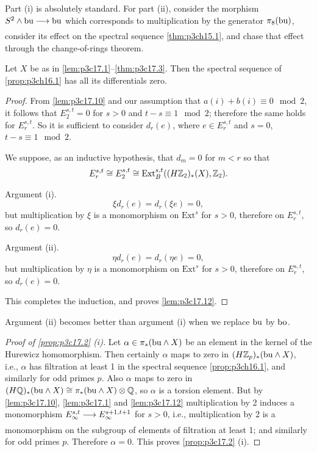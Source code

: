 \documentclass[../main]{subfiles}
\begin{document}
Part (i) is absolutely standard. For part (ii), consider the morphism $S^2 \wedge \te{bu} \lar{} \te{bu}$ which corresponds to multiplication by the generator $\pi_8(\mathrm{bu})$, consider its effect on the spectral sequence \ref{thm:p3ch15.1}, and chase that effect through the change-of-rings theorem.

\begin{lemma}
\label{lem:p3c17.12} 
Let $X$ be as in \ref{lem:p3c17.1}--\ref{thm:p3c17.3}. Then the spectral sequence of \ref{prop:p3ch16.1} has all its differentials zero. 
\end{lemma}

\begin{proof}
From \ref{lem:p3c17.10} and our assumption that $a(i) + b(i) \equiv 0 \mod 2$, it follows that $E_2^{s, t} = 0$ for $s > 0$ and $t - s \equiv 1 \mod 2$; therefore the same holds for $E_r^{s, t}$. So it is sufficient to consider $d_r(e)$, where $e \in E_r^{s, t}$ and $s = 0$, $t - s \equiv 1 \mod 2$. 

We suppose, as an inductive hypothesis, that $d_m = 0$ for $m < r$ so that \[E_r^{s, t} \cong E_2^{s, t} \cong \mathrm{Ext}_B^{s, t} ((H \mathbb{Z}_2)_\ast(X), \mathbb{Z}_2).\]

Argument (i). \[\xi d_r(e) = d_r(\xi e) = 0,\] but multiplication by $\xi$ is a monomorphism on $\mathrm{Ext}^s$ for $s > 0$, therefore on $E_r^{s, t}$, so $d_r(e) = 0$.

Argument (ii). \[\eta d_r(e) = d_r(\eta e) = 0,\] but multiplication by $\eta$ is a monomorphism on $\mathrm{Ext}^s$ for $s > 0$, therefore on $E_r^{s, t}$, so $d_r(e) = 0$.

This completes the induction, and proves \ref{lem:p3c17.12}. 
\end{proof}

\begin{remark*}
Argument (ii) becomes better than argument (i) when we replace $\mathrm{bu}$ by $\mathrm{bo}$. 
\end{remark*} 

\begin{proof}[Proof of \ref{prop:p3c17.2} (i)]
Let $\alpha \in \pi_\ast(\mathrm{bu} \wedge X)$ be an element in the kernel of the Hurewicz homomorphism. Then certainly $\alpha$ maps to zero in $(H \mathbb{Z}_p)_\ast(\mathrm{bu} \wedge X)$, i.e., $\alpha$ has filtration at least 1 in the spectral sequence \ref{prop:p3ch16.1}, and similarly for odd primes $p$. Also $\alpha$ maps to zero in $(H \mathbb{Q})_\ast(\mathrm{bu} \wedge X) \cong \pi_\ast(\mathrm{bu} \wedge X) \otimes \mathbb{Q}$, so $\alpha$ is a torsion element. But by \ref{lem:p3c17.10}, \ref{lem:p3c17.1} and \ref{lem:p3c17.12} multiplication by 2 induces a monomorphism $E_\infty^{s, t} \lar{} E_\infty^{s + 1, t + 1}$ for $s > 0$, i.e., multiplication by 2 is a monomorphism on the subgroup of elements of filtration at least 1; and similarly for odd primes $p$. Therefore $\alpha = 0$. This proves \ref{prop:p3c17.2} (i).
\end{proof}
\end{document}
